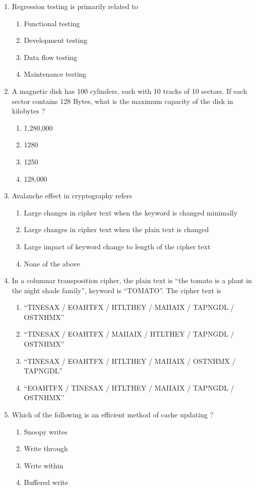 \documentclass[12pt]{article}
\begin{document}
\begin{enumerate}
\item[71.] Regression testing is primarily related to
\begin{enumerate}[label=\Alph*.]
  \item Functional testing
  \item Development testing
  \item Data flow testing
  \item Maintenance testing
\end{enumerate}

\item[72.] A magnetic disk has 100 cylinders, each with 10 tracks of 10 sectors. If each sector contains 128 Bytes, what is the maximum capacity of the disk in kilobytes ?
\begin{enumerate}[label=\Alph*.]
  \item 1,280,000
  \item 1280
  \item 1250
  \item 128,000
\end{enumerate}

\item[73.] Avalanche effect in cryptography refers
\begin{enumerate}[label=\Alph*.]
  \item Large changes in cipher text when the keyword is changed minimally
  \item Large changes in cipher text when the plain text is changed
  \item Large impact of keyword change to length of the cipher text
  \item None of the above
\end{enumerate}

\item[74.] In a columnar transposition cipher, the plain text is “the tomato is a plant in the night shade family”, keyword is “TOMATO”.   The cipher text is
\begin{enumerate}[label=\Alph*.]
  \item “TINESAX / EOAHTFX / HTLTHEY / MAIIAIX / TAPNGDL / OSTNHMX”
  \item “TINESAX / EOAHTFX / MAIIAIX / HTLTHEY / TAPNGDL / OSTNHMX”
  \item “TINESAX / EOAHTFX / HTLTHEY / MAIIAIX / OSTNHMX / TAPNGDL”
  \item “EOAHTFX / TINESAX / HTLTHEY / MAIIAIX / TAPNGDL / OSTNHMX”
\end{enumerate}

\item[75.] Which of the following is an efficient method of cache updating ?
\begin{enumerate}[label=\Alph*.]
  \item Snoopy writes
  \item Write through
  \item Write within
  \item Buffered write
\end{enumerate}


\end{enumerate}
\end{document}
